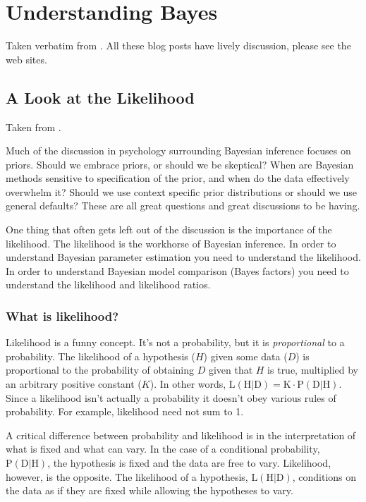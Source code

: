 
\chapter{Understanding Bayes}
\label{chap:UnderstandingBayes}


Taken verbatim from \cite{etz2015a,etz2015d,etz2015b,etz2015c,etz2016a}.
All these blog posts have lively discussion, please see the web sites.

\section{A Look at the Likelihood}
\label{sec:ALookattheLikelihood}

Taken from \cite{etz2015a}.

Much of the discussion in psychology surrounding Bayesian inference focuses on priors. Should we embrace priors, or should we be skeptical? When are Bayesian methods sensitive to specification of the prior, and when do the data effectively overwhelm it? Should we use context specific prior distributions or should we use general defaults? These are all great questions and great discussions to be having.

One thing that often gets left out of the discussion is the importance of the likelihood. The likelihood is the workhorse of Bayesian inference. In order to understand Bayesian parameter estimation you need to understand the likelihood. In order to understand Bayesian model comparison (Bayes factors) you need to understand the likelihood and likelihood ratios.

\subsection{What is likelihood?}

Likelihood is a funny concept. It's not a probability, but it is \textit{proportional} to a probability. The likelihood of a hypothesis ($H$) given some data ($D$) is proportional to the probability of obtaining $D$ given that $H$ is true, multiplied by an arbitrary positive constant ($K$). In other words, $\mathrm{L}(\mathrm{H} | \mathrm{D})=\mathrm{K} \cdot \mathrm{P}(\mathrm{D} | \mathrm{H})$. Since a likelihood isn't actually a probability it doesn't obey various rules of probability. For example, likelihood need not sum to 1.

A critical difference between probability and likelihood is in the interpretation of what is fixed and what can vary. In the case of a conditional probability, $\mathrm{P}(\mathrm{D} | \mathrm{H})$, the hypothesis is fixed and the data are free to vary. Likelihood, however, is the opposite. The likelihood of a hypothesis, $\mathrm{L}(\mathrm{H} | \mathrm{D})$, conditions on the data as if they are fixed while allowing the hypotheses to vary.

